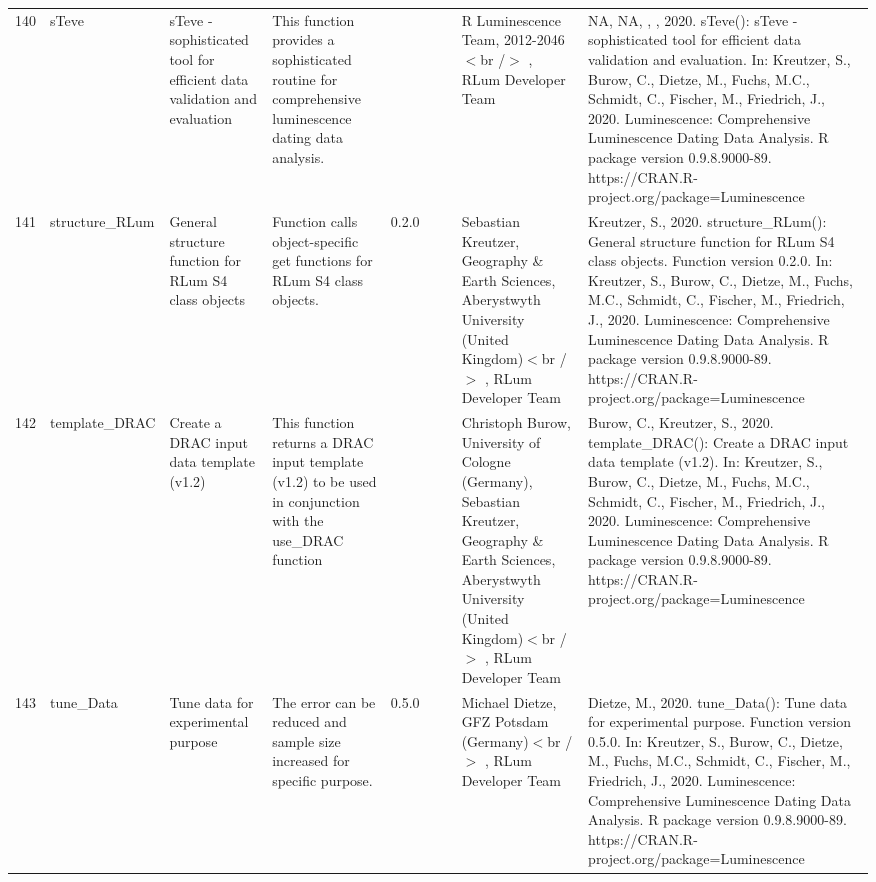 \begin{table}[ht]
\begin{tabular}{rllllllll}
 \\ 
  140 & sTeve & sTeve - sophisticated tool for efficient data validation and evaluation & This function provides a sophisticated routine for comprehensive luminescence dating data analysis. &  &  &  & R Luminescence Team, 2012-2046$<$br /$>$ , RLum Developer Team & NA, NA, , , 2020. sTeve(): sTeve - sophisticated tool for efficient data validation and evaluation. In: Kreutzer, S., Burow, C., Dietze, M., Fuchs, M.C., Schmidt, C., Fischer, M., Friedrich, J., 2020. Luminescence: Comprehensive Luminescence Dating Data Analysis. R package version 0.9.8.9000-89. https://CRAN.R-project.org/package=Luminescence
 \\ 
  141 & structure\_RLum & General structure function for RLum S4 class objects & Function calls object-specific get functions for RLum S4 class objects. & 0.2.0
 &  &  & Sebastian Kreutzer, Geography \& Earth Sciences, Aberystwyth University (United Kingdom)$<$br /$>$ , RLum Developer Team & Kreutzer, S., 2020. structure\_RLum(): General structure function for RLum S4 class objects. Function version 0.2.0. In: Kreutzer, S., Burow, C., Dietze, M., Fuchs, M.C., Schmidt, C., Fischer, M., Friedrich, J., 2020. Luminescence: Comprehensive Luminescence Dating Data Analysis. R package version 0.9.8.9000-89. https://CRAN.R-project.org/package=Luminescence
 \\ 
  142 & template\_DRAC & Create a DRAC input data template (v1.2) & This function returns a DRAC input template (v1.2) to be used in conjunction with the  use\_DRAC  function &  &  &  & Christoph Burow, University of Cologne (Germany), Sebastian Kreutzer, Geography \& Earth Sciences, Aberystwyth University (United Kingdom)$<$br /$>$ , RLum Developer Team & Burow, C., Kreutzer, S., 2020. template\_DRAC(): Create a DRAC input data template (v1.2). In: Kreutzer, S., Burow, C., Dietze, M., Fuchs, M.C., Schmidt, C., Fischer, M., Friedrich, J., 2020. Luminescence: Comprehensive Luminescence Dating Data Analysis. R package version 0.9.8.9000-89. https://CRAN.R-project.org/package=Luminescence
 \\ 
  143 & tune\_Data & Tune data for experimental purpose & The error can be reduced and sample size increased for specific purpose. & 0.5.0
 &  &  & Michael Dietze, GFZ Potsdam (Germany)$<$br /$>$ , RLum Developer Team & Dietze, M., 2020. tune\_Data(): Tune data for experimental purpose. Function version 0.5.0. In: Kreutzer, S., Burow, C., Dietze, M., Fuchs, M.C., Schmidt, C., Fischer, M., Friedrich, J., 2020. Luminescence: Comprehensive Luminescence Dating Data Analysis. R package version 0.9.8.9000-89. https://CRAN.R-project.org/package=Luminescence

\end{tabular}
\end{table}
